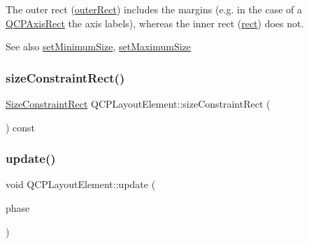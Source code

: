 The outer rect (\mbox{\hyperlink{class_q_c_p_layout_element_a2a32a12a6161c9dffbadeb9cc585510c}{outer\+Rect}}) includes the margins (e.\+g. in the case of a \mbox{\hyperlink{class_q_c_p_axis_rect}{Q\+C\+P\+Axis\+Rect}} the axis labels), whereas the inner rect (\mbox{\hyperlink{class_q_c_p_layout_element_a208effccfe2cca4a0eaf9393e60f2dd4}{rect}}) does not.

\begin{DoxySeeAlso}{See also}
\mbox{\hyperlink{class_q_c_p_layout_element_a5dd29a3c8bc88440c97c06b67be7886b}{set\+Minimum\+Size}}, \mbox{\hyperlink{class_q_c_p_layout_element_a74eb5280a737ab44833d506db65efd95}{set\+Maximum\+Size}} 
\end{DoxySeeAlso}
\mbox{\label{class_q_c_p_layout_element_a66136f121ee3e1c933b748761203cab4}} 
\subsubsection{\texorpdfstring{sizeConstraintRect()}{sizeConstraintRect()}}
{\footnotesize\ttfamily \mbox{\hyperlink{class_q_c_p_layout_element_a0afb3e5773529e4bd20e448f81be4d2a}{Size\+Constraint\+Rect}} Q\+C\+P\+Layout\+Element\+::size\+Constraint\+Rect (\begin{DoxyParamCaption}{ }\end{DoxyParamCaption}) const\hspace{0.3cm}{\ttfamily [inline]}}

\mbox{\label{class_q_c_p_layout_element_a929c2ec62e0e0e1d8418eaa802e2af9b}} 
\subsubsection{\texorpdfstring{update()}{update()}}
{\footnotesize\ttfamily void Q\+C\+P\+Layout\+Element\+::update (\begin{DoxyParamCaption}\item[{\mbox{\hyperlink{class_q_c_p_layout_element_a0d83360e05735735aaf6d7983c56374d}{Update\+Phase}}}]{phase }\end{DoxyParamCaption})\hspace{0.3cm}{\ttfamily [virtual]}}

